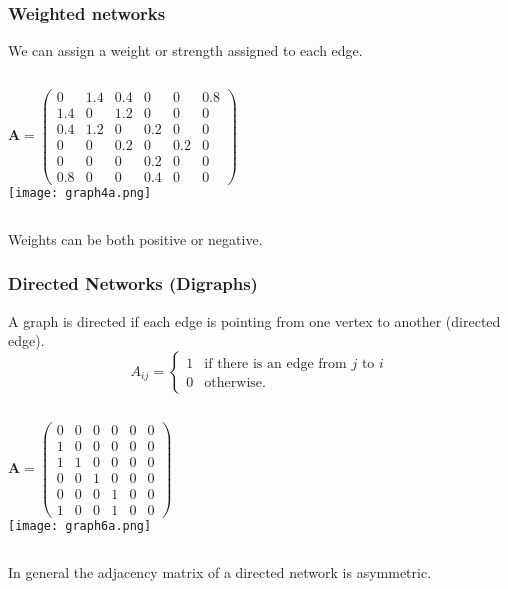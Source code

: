 \documentclass[10pt,aspectratio=169,dvipsnames]{beamer}
\begin{document}
\begin{frame}
\frametitle{Weighted networks}
We can assign a \alert{weight} or \alert{strength} assigned to each edge.
  \begin{columns}
\begin{equation*}
\mathbf{A}=\left(\begin{matrix}
0 & 1.4 & 0.4 & 0 & 0 & 0.8\\
1.4 & 0 & 1.2 & 0 & 0 & 0\\
0.4 & 1.2 & 0 & 0.2 & 0 & 0\\
0 & 0 & 0.2 & 0 & 0.2 & 0\\
0 & 0 & 0 & 0.2 & 0 & 0\\
0.8 & 0 & 0 & 0.4 & 0 & 0
\end{matrix}\right)
\end{equation*}
\texttt{[image: graph4a.png]}
\end{columns}
Weights can be both positive or negative.
\end{frame}
\begin{frame}
\frametitle{Directed Networks (Digraphs)}

A graph is \alert{directed} if each edge is pointing from one vertex to another (\alert{directed edge}).
\begin{equation*}
A_{ij} = \begin{cases} 1 &\mbox{if there is an edge from $j$ to $i$} \\
0 & \mbox{otherwise}. \end{cases}
\end{equation*}
  \begin{columns}
\begin{equation*}
\mathbf{A}=\left(\begin{matrix}
0 & 0 & 0 & 0 & 0 & 0\\
1 & 0 & 0 & 0 & 0 & 0\\
1 & 1 & 0 & 0 & 0 & 0\\
0 & 0 & 1 & 0 & 0 & 0\\
0 & 0 & 0 & 1 & 0 & 0\\
1 & 0 & 0 & 1 & 0 & 0
\end{matrix}\right)
\end{equation*}
\texttt{[image: graph6a.png]}
\end{columns}
In general the adjacency matrix of a directed network is asymmetric.
\end{frame}
\end{document}
